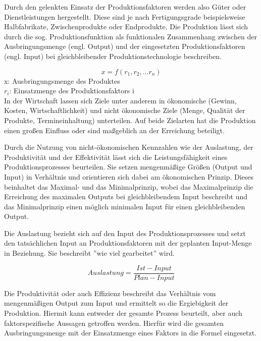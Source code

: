 \documentclass[a4paper,12pt, german]{report}
\begin{document}
Durch den gelenkten Einsatz der Produktionsfaktoren werden also Güter oder Dienstleistungen hergestellt. Diese sind je nach Fertigungsgrade beispielsweise Halbfabrikate, Zwischenprodukte oder Endprodukte.\cite{12}
Die Produktion lässt sich durch die sog. Produktionsfunktion als funktionalen Zusammenhang zwischen der Ausbringungsmenge (engl. Output) und der eingesetzten Produktionsfaktoren (engl. Input) bei gleichbleibender Produktionstechnologie beschreiben. \cite{20}

\begin{equation}
  x = f(r_1,r_2,...r_n) 
\end{equation}
x: Ausbringungsmenge des Produktes \\
$r_{i}$: Einsatzmenge des Produktionsfaktors i \\



In der Wirtschaft lassen sich Ziele unter anderem in ökonomische (Gewinn, Kosten, Wirtschaftlichkeit) und nicht ökonomische Ziele (Menge, Qualität der Produkte, Termineinhaltung) unterteilen. Auf beide Zielarten hat die Produktion einen großen Einfluss oder sind maßgeblich an der Erreichung beteiligt.

Durch die Nutzung von nicht-ökonomischen Kennzahlen wie der Auslastung, der Produktivität und der Effektivität lässt sich die Leistungsfähigkeit eines Produktionsprozesses beurteilen. Sie setzen mengenmäßige Größen (Output und Input) in Verhältnis und orientieren sich dabei am ökonomischen Prinzip. Dieses beinhaltet das Maximal- und das Minimalprinzip, wobei das Maximalprinzip die Erreichung des maximalen Outputs bei gleichbleibendem Input beschreibt und das Minimalprinzip einen möglich minimalen Input für einen gleichbleibenden Output. 

Die Auslastung bezieht sich auf den Input des Produktionsprozesses und setzt den tatsächlichen Input an Produktionsfaktoren mit der geplanten Input-Menge in Beziehung. Sie beschreibt ''wie viel gearbeitet'' wird. \cite{20}

\begin{equation}
  Auslastung =\frac{Ist-Input}{Plan-Input}
\end{equation}

Die Produktivität oder auch Effizienz beschreibt das Verhältnis vom mengenmäßigen Output zum Input und ermittelt so die Ergiebigkeit der Produktion. Hiermit kann entweder der gesamte Prozess beurteilt, aber auch faktorspezifische Aussagen getroffen werden. Hierfür wird die gesamten Ausbringungsmenge mit der Einsatzmenge eines Faktors in die Formel eingesetzt. \cite{20}
\end{document}
